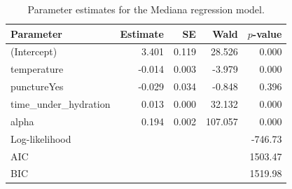 \begin{table}[ht]
\centering
\caption{Parameter estimates for the Mediana regression model.}
\label{tab:mediana}
\begin{tabular}{lrrrr}
\toprule
Parameter & Estimate & SE & Wald & $p$-value\\
\midrule
(Intercept) & 3.401 & 0.119 & 28.526 & 0.000\\
temperature & -0.014 & 0.003 & -3.979 & 0.000\\
punctureYes & -0.029 & 0.034 & -0.848 & 0.396\\
time_under_hydration & 0.013 & 0.000 & 32.132 & 0.000\\
alpha & 0.194 & 0.002 & 107.057 & 0.000\\
\midrule
Log-likelihood & \multicolumn{4}{r}{-746.73}\\
AIC & \multicolumn{4}{r}{1503.47}\\
BIC & \multicolumn{4}{r}{1519.98}\\
\bottomrule
\end{tabular}
\end{table}
